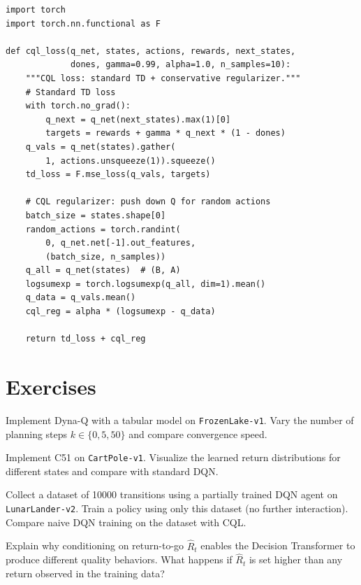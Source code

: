 \begin{codeblock}[title=\textbf{CQL Regularization (Sketch)}]
\begin{verbatim}
import torch
import torch.nn.functional as F

def cql_loss(q_net, states, actions, rewards, next_states,
             dones, gamma=0.99, alpha=1.0, n_samples=10):
    """CQL loss: standard TD + conservative regularizer."""
    # Standard TD loss
    with torch.no_grad():
        q_next = q_net(next_states).max(1)[0]
        targets = rewards + gamma * q_next * (1 - dones)
    q_vals = q_net(states).gather(
        1, actions.unsqueeze(1)).squeeze()
    td_loss = F.mse_loss(q_vals, targets)

    # CQL regularizer: push down Q for random actions
    batch_size = states.shape[0]
    random_actions = torch.randint(
        0, q_net.net[-1].out_features,
        (batch_size, n_samples))
    q_all = q_net(states)  # (B, A)
    logsumexp = torch.logsumexp(q_all, dim=1).mean()
    q_data = q_vals.mean()
    cql_reg = alpha * (logsumexp - q_data)

    return td_loss + cql_reg
\end{verbatim}
\end{codeblock}

\section{Exercises}
\label{sec:sota:exercises}

\begin{exercise}[Dyna-Q]
Implement Dyna-Q with a tabular model on \texttt{FrozenLake-v1}.
Vary the number of planning steps $k \in \{0, 5, 50\}$ and compare
convergence speed.
\end{exercise}

\begin{exercise}[Distributional RL]
Implement C51 on \texttt{CartPole-v1}. Visualize the learned return
distributions for different states and compare with standard DQN.
\end{exercise}

\begin{exercise}
Collect a dataset of 10000 transitions using a partially trained DQN
agent on \texttt{LunarLander-v2}. Train a policy using only this
dataset (no further interaction). Compare naive DQN training on the
dataset with CQL.
\end{exercise}

\begin{exercise}
Explain why conditioning on return-to-go $\hat{R}_t$ enables the
Decision Transformer to produce different quality behaviors. What
happens if $\hat{R}_t$ is set higher than any return observed in the
training data?
\end{exercise}
